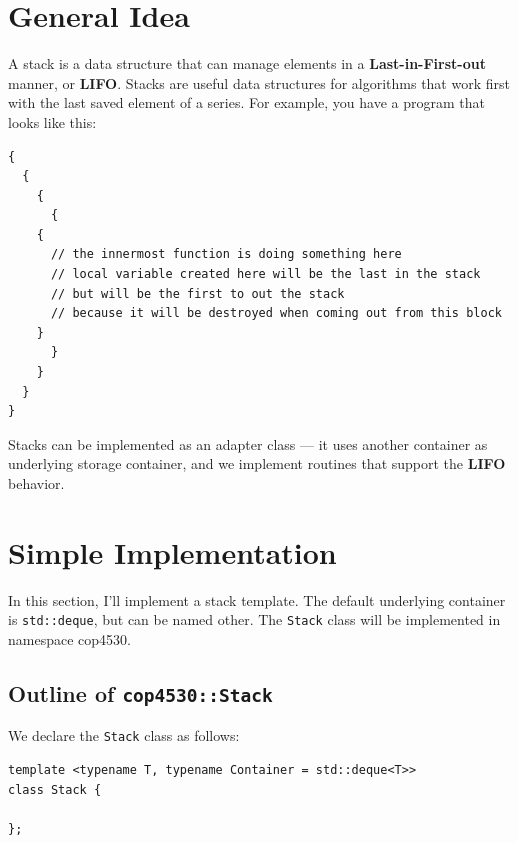 \documentclass[11pt]{book}
\begin{document}
\section{General Idea}
\label{sec:org429ab49}
A stack is a data structure that can manage elements in a \textbf{Last-in-First-out} manner, or \textbf{LIFO}. Stacks are useful data structures for algorithms that work first with the last saved element of a series. For example, you have a program that looks like this:
\begin{verbatim}
{
  {
    {
      {
	{
	  // the innermost function is doing something here
	  // local variable created here will be the last in the stack
	  // but will be the first to out the stack
	  // because it will be destroyed when coming out from this block
	}
      }
    }
  }
}
\end{verbatim}

Stacks can be implemented as an adapter class --- it uses another container as underlying storage container, and we implement routines that support the \textbf{LIFO} behavior.
\section{Simple Implementation}
\label{sec:orgab4c18d}
In this section, I'll implement a stack template. The default underlying container is \texttt{std::deque}, but can be named other. The \texttt{Stack} class will be implemented in namespace cop4530.
\subsection{Outline of \texttt{cop4530::Stack}}
\label{sec:org7efe8e8}
We declare the \texttt{Stack} class as follows:
\begin{verbatim}
template <typename T, typename Container = std::deque<T>>
class Stack {

};
\end{verbatim}
\end{document}
